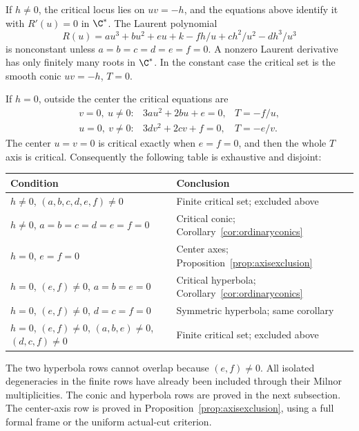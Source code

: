 If $h\ne0$, the critical locus lies on $uv=-h$, and the equations
above identify it with $R'(u)=0$ in $\C^*$. The Laurent polynomial
\[
 R(u)=a u^3+b u^2+e u+k-fh/u+ch^2/u^2-dh^3/u^3
\]
is nonconstant unless $a=b=c=d=e=f=0$. A nonzero Laurent
derivative has only finitely many roots in $\C^*$. In the constant
case the critical set is the smooth conic $uv=-h$, $T=0$.

If $h=0$, outside the center the critical equations are
\[
 \begin{array}{lll}
 v=0,\ u\ne0:&3au^2+2bu+e=0,&T=-f/u,\\
 u=0,\ v\ne0:&3dv^2+2cv+f=0,&T=-e/v.
 \end{array}
\]
The center $u=v=0$ is critical exactly when $e=f=0$, and then
the whole $T$ axis is critical. Consequently the following table
is exhaustive and disjoint:
\begin{center}\small
\begin{tabular}{@{}p{}p{}@{}}
\toprule
Condition & Conclusion\\
\midrule
$h\ne0$, $(a,b,c,d,e,f)\ne0$ & Finite critical set; excluded above\\
$h\ne0$, $a=b=c=d=e=f=0$ & Critical conic; Corollary~\ref{cor:ordinaryconics}\\
$h=0$, $e=f=0$ & Center axes; Proposition~\ref{prop:axisexclusion}\\
$h=0$, $(e,f)\ne0$, $a=b=e=0$ & Critical hyperbola; Corollary~\ref{cor:ordinaryconics}\\
$h=0$, $(e,f)\ne0$, $d=c=f=0$ & Symmetric hyperbola; same corollary\\
$h=0$, $(e,f)\ne0$, $(a,b,e)\ne0$, $(d,c,f)\ne0$
 & Finite critical set; excluded above\\
\bottomrule
\end{tabular}
\end{center}
The two hyperbola rows cannot overlap because $(e,f)\ne0$.
All isolated degeneracies in the finite rows have already been
included through their Milnor multiplicities. The conic and hyperbola rows are proved in the next subsection.
The center-axis row is proved in Proposition~\ref{prop:axisexclusion},
using a full formal frame or the uniform actual-cut criterion.
